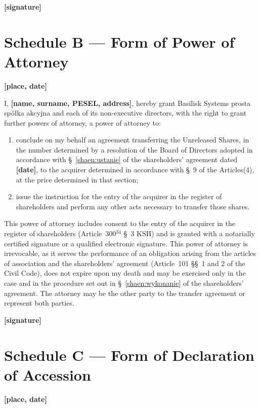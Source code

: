 \documentclass[12pt,a4paper]{report}
\newcommand{\field}[1]{\textbf{[#1]}}
\newcommand{\CompanyFull}{Basilisk Systems prosta spółka akcyjna}
\newcommand{\USen}[1]{\S~#1 of the Articles}
\begin{document}
\field{signature}

\newpage
\section*{Schedule B --- Form of Power of Attorney}

\field{place, date}

I, \field{name, surname, PESEL, address}, hereby grant \CompanyFull{} and each of its non-executive directors, with the right to grant further powers of attorney, a power of attorney to:

\begin{enumerate}
  \item conclude on my behalf an agreement transferring the Unreleased Shares, in the number determined by a resolution of the Board of Directors adopted in accordance with \S~\ref{shaen:ustanie} of the shareholders' agreement dated \field{date}, to the acquirer determined in accordance with \USen{9}(4), at the price determined in that section;
  \item issue the instruction for the entry of the acquirer in the register of shareholders and perform any other acts necessary to transfer those shares.
\end{enumerate}

This power of attorney includes consent to the entry of the acquirer in the register of shareholders (Article~300$^{34}$ \S~3 KSH) and is granted with a notarially certified signature or a qualified electronic signature. This power of attorney is irrevocable, as it serves the performance of an obligation arising from the articles of association and the shareholders' agreement (Article~101 \S\S~1 and 2 of the Civil Code), does not expire upon my death and may be exercised only in the case and in the procedure set out in \S~\ref{shaen:wykonanie} of the shareholders' agreement. The attorney may be the other party to the transfer agreement or represent both parties.

\field{signature}

\newpage
\section*{Schedule C --- Form of Declaration of Accession}

\field{place, date}
\end{document}
